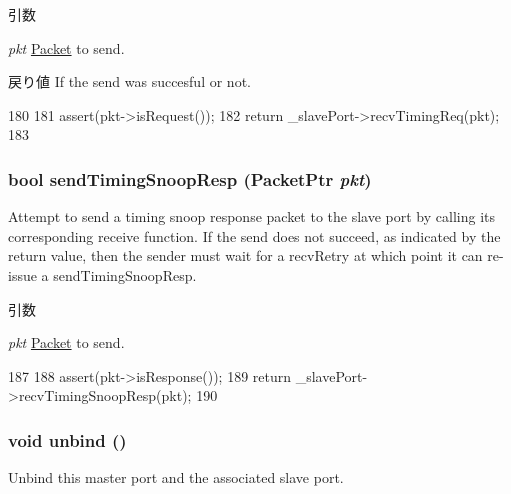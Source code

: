 \begin{DoxyParams}{引数}
\item[{\em pkt}]\hyperlink{classPacket}{Packet} to send.\end{DoxyParams}
\begin{DoxyReturn}{戻り値}
If the send was succesful or not. 
\end{DoxyReturn}



\begin{DoxyCode}
180 {
181     assert(pkt->isRequest());
182     return _slavePort->recvTimingReq(pkt);
183 }
\end{DoxyCode}
\hypertarget{classMasterPort_a4853cc2d61a4dee331dfaeaa54f64fcb}{
\subsubsection[{sendTimingSnoopResp}]{\setlength{\rightskip}{0pt plus 5cm}bool sendTimingSnoopResp ({\bf PacketPtr} {\em pkt})}}
\label{classMasterPort_a4853cc2d61a4dee331dfaeaa54f64fcb}
Attempt to send a timing snoop response packet to the slave port by calling its corresponding receive function. If the send does not succeed, as indicated by the return value, then the sender must wait for a recvRetry at which point it can re-\/issue a sendTimingSnoopResp.


\begin{DoxyParams}{引数}
\item[{\em pkt}]\hyperlink{classPacket}{Packet} to send. \end{DoxyParams}



\begin{DoxyCode}
187 {
188     assert(pkt->isResponse());
189     return _slavePort->recvTimingSnoopResp(pkt);
190 }
\end{DoxyCode}
\hypertarget{classMasterPort_af294915156f1e30f1d2e574dccc87945}{
\subsubsection[{unbind}]{\setlength{\rightskip}{0pt plus 5cm}void unbind ()}}
\label{classMasterPort_af294915156f1e30f1d2e574dccc87945}
Unbind this master port and the associated slave port. 

